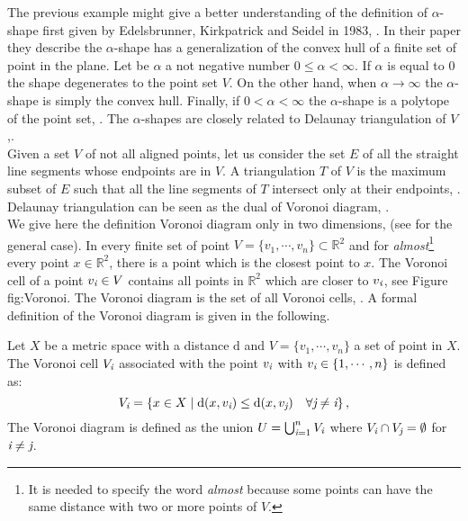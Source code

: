 The previous example might give a better understanding of the definition of $\alpha$-shape first given by Edelsbrunner, Kirkpatrick and Seidel in 1983, \cite{edelsbrunner1983shape}. In their paper they describe the $\alpha$-shape has a generalization of the convex hull of a finite set of point in the plane. Let be $\alpha$ a not negative number $0\leq\alpha<\infty$. 
If $\alpha$ is equal to $0$ the shape degenerates to the point set $V$. On the other hand, when $\alpha\rightarrow\infty$ the $\alpha$-shape is simply the convex hull. Finally, if $0<\alpha<\infty$ the $\alpha$-shape is a polytope of the point set, \cite{edelsbrunner1994three}. The $\alpha$-shapes are closely related to Delaunay triangulation of $V$,\cite{mucke1993shapes}.\\ \indent
Given a set $V$ of not all aligned points, let us consider the set $E$ of all the straight line segments whose endpoints are in $V$. 
A triangulation $T$ of $V$ is the maximum subset of $E$ such that all the line segments of $T$ intersect only at their endpoints, \cite{lloyd1977triangulations}. \\ \indent 
Delaunay triangulation can be seen as the dual of Voronoi diagram, \cite{fortune1992voronoi}.\\\indent
We give here the definition Voronoi diagram only in two dimensions, (see \cite{brown1979voronoi} for the general case).
In every finite set of point $V = \{v_1, \cdots, v_n\}\subset \mathbb{R}^2$ and for \textit{almost}\footnote{It is needed to specify the word \textit{almost} because some points can have the same distance with two or more points of $V$.} every point $x\in \mathbb{R}^2$, there is a point which is the closest point to $x$. The Voronoi cell of a point $v_{\textit{i}}\in V$ contains all points in $\mathbb{R}^2$ which are closer to $v_{\textit{i}}$, see Figure {fig:Voronoi}. 
The Voronoi diagram is the set of all Voronoi cells, \cite{cazals2005conformal}.
A formal definition of the Voronoi diagram is given in the following.
\begin{defn}
Let $X$ be a metric space with a distance $\textrm{d}$ and $V=\{v_1,\cdots,v_n\}$ a set of point in $X$. The Voronoi cell $V_{\textit{i}}$ associated with the point $v_{\textit{i}}$ with $v_{\textit{i}}\in\{1,\cdots,n\}$ is defined as:
\begin{equation}
V_{\textit{i}}=\{x\in X\; | \;\textrm{d}(x,v_{\textit{i}})\leq \textrm{d}(x,v_{\textit{j}}) \quad \forall \textit{j}\neq \textit{i} \}\,,
\end{equation}
The Voronoi diagram is defined as the union $U = \bigcup_{\textit{i}=1}^n V_{\textit{i}}$ where $V_{\textit{i}}\cap V_{\textit{j}}= \emptyset$ for $\textit{i}\neq\textit{j}$.
\end{defn}
